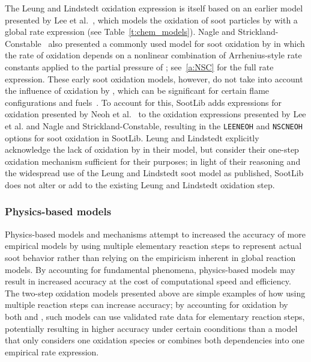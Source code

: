 \documentclass[preprint,12pt,letterpaper]{elsarticle}
\begin{document}
The Leung and Lindstedt oxidation expression is itself based on an earlier model presented by Lee et al.~\cite{Lee_1962}, which models the oxidation of soot particles by  with a global rate expression (see Table~\ref{t:chem_models}). Nagle and Strickland-Constable~\cite{Nagle_1962} also presented a commonly used model for soot oxidation by  in which the rate of oxidation depends on a nonlinear combination of Arrhenius-style rate constants applied to the partial pressure of ; see~\ref{a:NSC} for the full rate expression. These early soot oxidation models, however, do not take into account the influence of oxidation by , which can be significant for certain flame configurations and fuels~\cite{Neoh_1980}. To account for this, SootLib adds expressions for  oxidation presented by Neoh et al.~\cite{Neoh_1981} to the oxidation expressions presented by Lee et al. and Nagle and Strickland-Constable, resulting in the \texttt{LEE\textunderscore NEOH} and \texttt{NSC\textunderscore NEOH} options for soot oxidation in SootLib. Leung and Lindstedt explicitly acknowledge the lack of oxidation by  in their model, but consider their one-step oxidation mechanism sufficient for their purposes; in light of their reasoning and the widespread use of the Leung and Lindstedt soot model as published, SootLib does not alter or add to the existing Leung and Lindstedt oxidation step.

\subsubsection{Physics-based models}
\label{sss:physics-models}

Physics-based models and mechanisms attempt to increased the accuracy of more empirical models by using multiple elementary reaction steps to represent actual soot behavior rather than relying on the empiricism inherent in global reaction models. By accounting for fundamental phenomena, physics-based models may result in increased accuracy at the cost of computational speed and efficiency. The two-step oxidation models presented above are simple examples of how using multiple reaction steps can increase accuracy; by accounting for oxidation by both  and , such models can use validated rate data for elementary reaction steps, potentially resulting in higher accuracy under certain coonditions than a model that only considers one oxidation species or combines both dependencies into one empirical rate expression.
\end{document}
